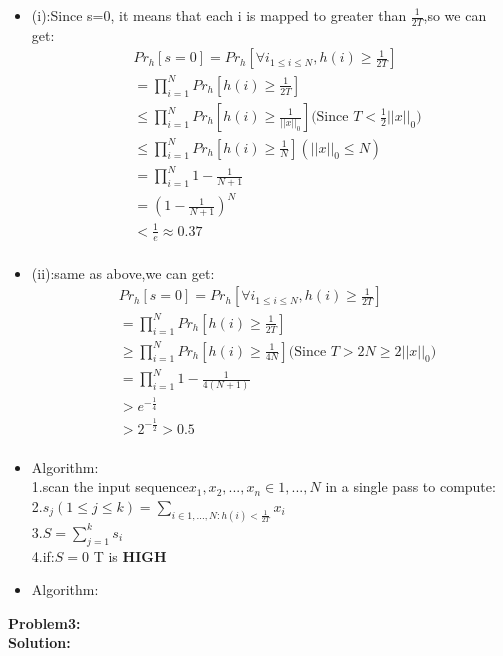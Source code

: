 \documentclass{article}
\begin{document}
\begin{itemize}
    \item (i):Since s=0, it means that each i is mapped to greater than $\frac{1}{2T}$,so we can get:$$
    \begin{aligned}
    &Pr_h[s=0] = Pr_h[{\forall}i_{1 \leq i \leq N},h(i) \geq \frac{1}{2T}]\\
    &=\prod_{i=1}^{N}Pr_h[h(i) \geq \frac{1}{2T}]\\
    &\leq \prod_{i=1}^{N}Pr_h[h(i) \geq \frac{1}{||x||_0}]\text{(Since $T < \frac{1}{2}||x||_0)$}\\
    &\leq \prod_{i=1}^{N}Pr_h[h(i) \geq \frac{1}{N}](||x||_0 \leq N)\\
    &=\prod_{i=1}^{N}1-\frac{1}{N+1}\\
    &=(1-\frac{1}{N+1})^{N}\\
    &< \frac{1}{e} \approx 0.37\\
    \end{aligned}$$
    \item (ii):same as above,we can get:$$
    \begin{aligned}
    &Pr_h[s=0] = Pr_h[{\forall}i_{1 \leq i \leq N},h(i) \geq \frac{1}{2T}]\\
    &=\prod_{i=1}^{N}Pr_h[h(i) \geq \frac{1}{2T}]\\
    &\geq \prod_{i=1}^{N}Pr_h[h(i) \geq \frac{1}{4N}] \text{(Since $T >2N \geq 2||x||_0$)}\\
    &=\prod_{i=1}^{N}1 - \frac{1}{4(N+1)}\\
    &> e^{- \frac{1}{4}}\\
    &> 2^{-\frac{1}{2}} > 0.5\\
    \end{aligned}$$
    \item Algorithm:\\

    1.scan the input sequence$x_1, x_2,...,x_n \in 1,...,N$ in a single pass to compute:\\
    2.$s_j(1 \leq j \leq k) = \sum_{i \in 1,...,N:h(i) < \frac{1}{2T}}x_i$\\
    3.$S=\sum_{j=1}^{k}s_i$\\
    4.if:$S=0$ T is \textbf{HIGH}\\ 
    \item Algorithm:
\end{itemize}
\noindent\textbf{Problem3:}\\
\textbf{Solution:}\\
\end{document}
